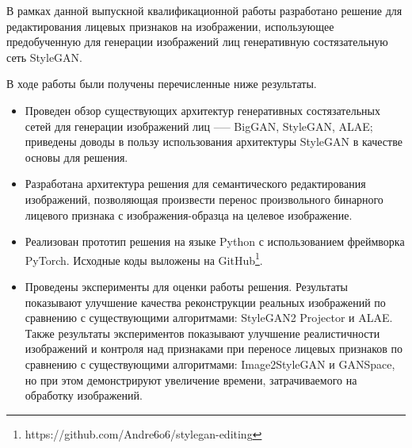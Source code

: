 
В рамках данной выпускной квалификационной работы разработано решение для редактирования лицевых признаков на изображении, использующее предобученную для генерации изображений лиц генеративную состязательную сеть StyleGAN. 

В ходе работы были получены перечисленные ниже результаты.

\begin{itemize}
\item Проведен обзор существующих архитектур генеративных состязательных сетей для генерации изображений лиц --— BigGAN, StyleGAN, ALAE; приведены доводы в пользу использования архитектуры StyleGAN в качестве основы для решения.
\item Разработана архитектура решения для семантического редактирования изображений, позволяющая произвести перенос произвольного бинарного лицевого признака с изображения-образца на целевое изображение.
\item Реализован прототип решения на языке Python с использованием фреймворка PyTorch. Исходные коды выложены на GitHub\footnote{https://github.com/Andre6o6/stylegan-editing}.

\item Проведены эксперименты для оценки работы решения. 
Результаты показывают улучшение качества реконструкции реальных изображений по сравнению с существующими алгоритмами: \linebreak StyleGAN2 Projector и ALAE. 
Также  результаты экспериментов показывают улучшение реалистичности изображений и контроля над признаками при переносе лицевых признаков по сравнению с существующими алгоритмами: Image2StyleGAN и GANSpace, но при этом демонстрируют увеличение времени, затрачиваемого на обработку изображений.

\end{itemize}